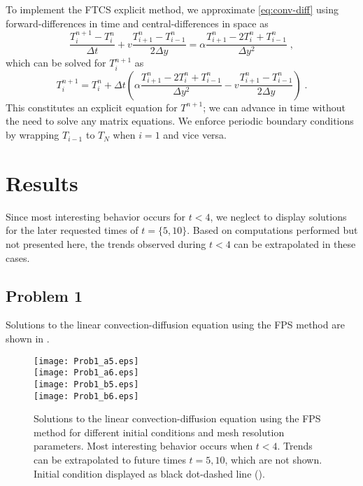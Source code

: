 \documentclass[11pt]{article}
\begin{document}
To implement the FTCS explicit method, we approximate \eqref{eq:conv-diff} using forward-differences in time and central-differences in space as
\begin{equation}
\frac{T_i^{n+1} - T_i^n}{\Delta t}
+ v \frac{T_{i+1}^n - T_{i-1}^n}{2 \Delta y}
=
\alpha \frac{T_{i+1}^n - 2 T_i^n + T_{i-1}^n}{\Delta y^2}
\;,
\end{equation}
which can be solved for $T_i^{n+1}$ as
\begin{equation}
T_i^{n+1}
=
T_i^n +
\Delta t
\left(
\alpha \frac{T_{i+1}^n - 2 T_i^n + T_{i-1}^n}{\Delta y^2}
- v \frac{T_{i+1}^n - T_{i-1}^n}{2 \Delta y}
\right)
\;.
\end{equation}
This constitutes an explicit equation for $T^{n+1}$; we can advance in time without the need to solve any matrix equations. We enforce periodic boundary conditions by wrapping $T_{i-1}$ to $T_{N}$ when $i=1$ and vice versa.

\section{Results} %

Since most interesting behavior occurs for $t<4$, we neglect to display solutions for the later requested times of $t = \{5, 10\}$. Based on computations performed but not presented here, the trends observed during $t<4$ can be extrapolated in these cases.

\subsection{Problem 1}

Solutions to the linear convection-diffusion equation using the FPS method are shown in .

\begin{figure}[p!]
\begin{center}
\texttt{[image: Prob1\_a5.eps]} \\
\texttt{[image: Prob1\_a6.eps]} \\
\texttt{[image: Prob1\_b5.eps]} \\
\texttt{[image: Prob1\_b6.eps]}
\\[0.5cm]
\caption{Solutions to the linear convection-diffusion equation using the FPS method for different initial conditions and mesh resolution parameters. Most interesting behavior occurs when $t<4$. Trends can be extrapolated to future times $t=5, 10$, which are not shown. Initial condition displayed as black dot-dashed line (\dotdashrule).}
\label{fig:Prob1}
\end{center}
\end{figure}
\end{document}
